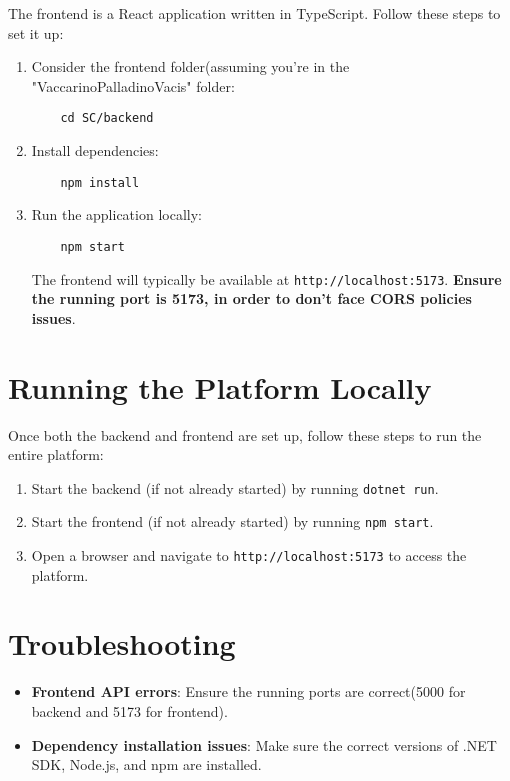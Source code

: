 The frontend is a React application written in TypeScript. Follow these steps to set it up:
\begin{enumerate}
    \item Consider the frontend folder(assuming you're in the "VaccarinoPalladinoVacis" folder:
    \begin{verbatim}
    cd SC/backend
    \end{verbatim}

    \item Install dependencies:
    \begin{verbatim}
    npm install
    \end{verbatim}

    \item Run the application locally:
    \begin{verbatim}
    npm start
    \end{verbatim}
    The frontend will typically be available at \texttt{http://localhost:5173}. \textbf{Ensure the running port is 5173, in order to don't face CORS policies issues}.
\end{enumerate}

\section{Running the Platform Locally}

Once both the backend and frontend are set up, follow these steps to run the entire platform:
\begin{enumerate}
    \item Start the backend (if not already started) by running \texttt{dotnet run}.
    \item Start the frontend (if not already started) by running \texttt{npm start}.
    \item Open a browser and navigate to \texttt{http://localhost:5173} to access the platform.
\end{enumerate}

\section{Troubleshooting}

\begin{itemize}
    \item \textbf{Frontend API errors}: Ensure the running ports are correct(5000 for backend and 5173 for frontend).
    \item \textbf{Dependency installation issues}: Make sure the correct versions of .NET SDK, Node.js, and npm are installed.
\end{itemize}
